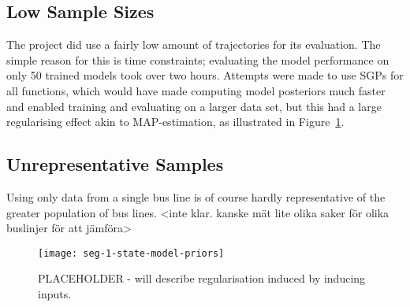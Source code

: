 \subsection{Low Sample Sizes}
The project did use a fairly low amount of trajectories for its
evaluation. The simple reason for this is time constraints; evaluating
the model performance on only 50 trained models took over two hours.
Attempts were made to use SGPs for all functions, which would have made
computing model posteriors much faster and enabled training and
evaluating on a larger data set, but this had a
large regularising effect akin to MAP-estimation, as illustrated in Figure~\ref{fig:inducing-inputs-regularisation}.

\subsection{Unrepresentative Samples}
Using only data from a single bus line is of course hardly
representative of the greater population of bus lines. <inte
klar. kanske mät lite olika saker för olika buslinjer för att jämföra>

\begin{figure}
  \texttt{[image: seg-1-state-model-priors]}
  \caption{PLACEHOLDER - will describe regularisation induced by
    inducing inputs.}\label{fig:inducing-inputs-regularisation}
\end{figure}




